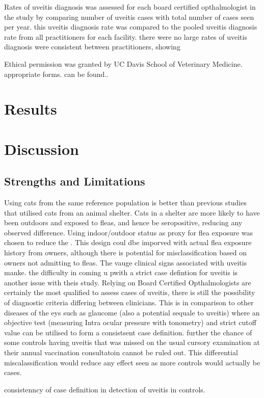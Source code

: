 \documentclass[11pt,twocolumn]{article}
\begin{document}
		Rates of uveitis diagnosis was assessed for each board certified opthalmologist in the study by comparing number of uveitis cases with total number of cases seen per year. this uveitis diagnosis rate was compared to the pooled uveitis diagnosis rate from all practitioners for each facility. 
		there were no large 
		rates of uveitis diagnosis were consistent between practitioners, showing 




	Ethical permission was granted by UC Davis School of Veterinary Medicine. appropriate forms. can be found..

\section{Results}
\section{Discussion}
	\subsection{Strengths and Limitations}
		Using cats from the same reference population is better than previous studies that utilised cats from an animal shelter. Cats in a shelter are more likely to have been outdoors and exposed to fleas, and hence be seropositive, reducing any observed difference.
		Using indoor/outdoor status as proxy for flea exposure was chosen to reduce the . 
		This design coul dbe imporved with actual flea exposure history from owners, although there is potential for misclassification based on owners not admitting to fleas.
		The vauge clinical signs associated with uveitis manke.
		the difficulty in coming u pwith a strict case defintion for uveitis is another issue with theis study. Relying on Board Certified Opthalmologists are certainly the most qualified to assess cases of uveitis, there is still the possibility of diagnostic criteria differing between clinicians. This is in comparison to other diseases of the eys such as glaucome (also a potential sequale to uveitis) where an objective test (measuring Intra ocular pressure with tonometry) and strict cutoff value can be utilised to form a consistsent case definition.
		further the chance of some controls having uveitis that was missed on the usual cursory examination at their annual vaccination consultatoin cannot be ruled out. This differential miscalassification would reduce any effect seen as more controls would actually be cases.


		consistenncy of case definition in 
		detection of uveitis in controls.
\newpage


\end{document}
